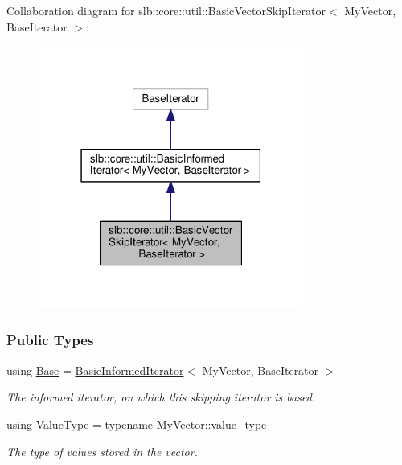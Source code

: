 Collaboration diagram for slb\+:\+:core\+:\+:util\+:\+:Basic\+Vector\+Skip\+Iterator$<$ My\+Vector, Base\+Iterator $>$\+:\nopagebreak
\begin{figure}[H]
\begin{center}
\leavevmode
\includegraphics[width=247pt]{structslb_1_1core_1_1util_1_1BasicVectorSkipIterator__coll__graph}
\end{center}
\end{figure}
\subsubsection*{Public Types}
\begin{DoxyCompactItemize}
\item 
using \hyperlink{structslb_1_1core_1_1util_1_1BasicVectorSkipIterator_a1f81c5bdd82df852058bc0396ac54514}{Base} = \hyperlink{structslb_1_1core_1_1util_1_1BasicInformedIterator}{Basic\+Informed\+Iterator}$<$ My\+Vector, Base\+Iterator $>$\hypertarget{structslb_1_1core_1_1util_1_1BasicVectorSkipIterator_a1f81c5bdd82df852058bc0396ac54514}{}\label{structslb_1_1core_1_1util_1_1BasicVectorSkipIterator_a1f81c5bdd82df852058bc0396ac54514}

\begin{DoxyCompactList}\small\item\em The informed iterator, on which this skipping iterator is based. \end{DoxyCompactList}\item 
using \hyperlink{structslb_1_1core_1_1util_1_1BasicVectorSkipIterator_afa39da0ab694b51d0abd089e7612a763}{Value\+Type} = typename My\+Vector\+::value\+\_\+type\hypertarget{structslb_1_1core_1_1util_1_1BasicVectorSkipIterator_afa39da0ab694b51d0abd089e7612a763}{}\label{structslb_1_1core_1_1util_1_1BasicVectorSkipIterator_afa39da0ab694b51d0abd089e7612a763}

\begin{DoxyCompactList}\small\item\em The type of values stored in the vector. \end{DoxyCompactList}\end{DoxyCompactItemize}
